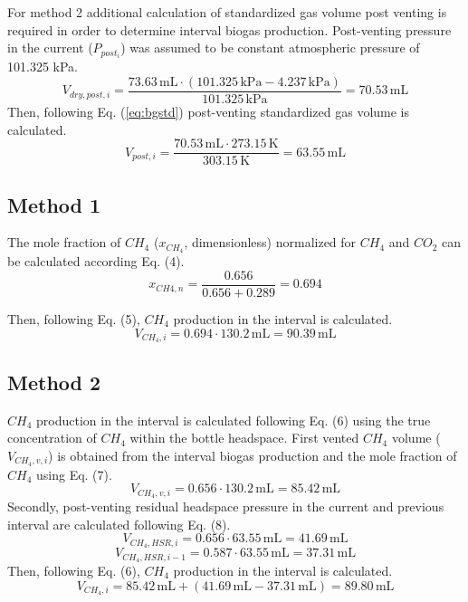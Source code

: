 \documentclass[]{article}
\newcommand{\unit}[1]{\ensuremath{\, \mathrm{#1}}}
\begin{document}
For method 2 additional calculation of standardized gas volume post venting is required in order to determine interval biogas production. Post-venting pressure in the current ($P_{post_{i}}$) was assumed to be constant atmospheric pressure of 101.325 kPa.  
\begin{equation*}
   V_{dry,post,i} = \frac{73.63\unit{mL} \cdot (101.325\unit{kPa} - 4.237\unit{kPa})}{101.325\unit{kPa}} = 70.53\unit{mL}  
\end{equation*}
Then, following Eq. (\ref{eq:bgstd}) post-venting standardized gas volume is calculated.
\begin{equation*}
    V_{post,i} = \frac{70.53\unit{mL} \cdot 273.15\unit{K}}{303.15\unit{K}} = 63.55\unit{mL}  
\end{equation*}

\subsection{Method 1}
The mole fraction of $CH_{4}$ ($x_{CH_4}$, dimensionless) normalized for $CH_{4}$ and $CO_{2}$ can be calculated according Eq. (4).
\begin{equation*}
    x_{CH{4},n} = \frac{0.656}{0.656 + 0.289} = 0.694
\end{equation*}

Then, following Eq. (5), $CH_{4}$ production in the interval is calculated.
\begin{equation*}
  V_{CH_4, i} = 0.694 \cdot 130.2\unit{mL}  = 90.39\unit{mL} 
\end{equation*}

\subsection{Method 2}
$CH_{4}$ production in the interval is calculated following Eq. (6) using the true concentration of $CH_{4}$ within the bottle headspace.
First vented $CH_{4}$ volume ($V_{CH_4, v,i}$) is obtained from the interval biogas production and the mole fraction of $CH_{4}$ using Eq. (7).
\begin{equation*}
  V_{CH_4, v, i} = 0.656 \cdot 130.2\unit{mL}  = 85.42\unit{mL} 
\end{equation*}
Secondly, post-venting residual headspace pressure in the current and previous interval are calculated following Eq. (8).
\begin{equation*}
  V_{CH_4, HSR, i} = 0.656 \cdot 63.55\unit{mL}  = 41.69\unit{mL} 
\end{equation*}
\begin{equation*}
  V_{CH_4, HSR, i-1} = 0.587 \cdot 63.55\unit{mL}  = 37.31\unit{mL} 
\end{equation*}
Then, following Eq. (6), $CH_{4}$ production in the interval is calculated.
\begin{equation*}
  V_{CH_{4},i} = 85.42\unit{mL} + (41.69\unit{mL} - 37.31\unit{mL})  = 89.80\unit{mL} 
\end{equation*}
\end{document}
